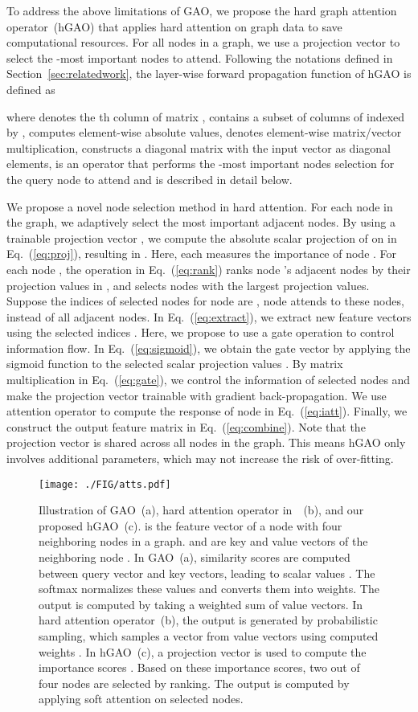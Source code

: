 \documentclass[sigconf]{acmart}
\begin{document}
To address the above limitations of GAO, we propose the hard graph
attention operator~(hGAO) that applies hard attention on graph data
to save computational resources. For all nodes in a graph, we use a
projection vector  to select the
-most important nodes to attend. Following the notations defined
in Section~\ref{sec:relatedwork}, the layer-wise forward propagation
function of hGAO is defined as

where  denotes the th column of matrix
,  contains a
subset of columns of  indexed by
,  computes element-wise absolute
values,  denotes element-wise matrix/vector multiplication,
 constructs a diagonal matrix with the input
vector as diagonal elements,  is an
operator that performs the -most important nodes selection for
the query node  to attend and is described in detail below.

We propose a novel node selection method in hard attention. For each
node in the graph, we adaptively select the  most important
adjacent nodes. By using a trainable projection vector , we compute the absolute scalar projection of  on
 in Eq.~(\ref{eq:proj}), resulting in . Here, each  measures the
importance of node . For each node , the
 operation in Eq.~(\ref{eq:rank}) ranks
node 's adjacent nodes by their projection values in , and selects nodes with the  largest projection values.
Suppose the indices of selected nodes for node  are
, node  attends to
these  nodes, instead of all adjacent nodes. In
Eq.~(\ref{eq:extract}), we extract new feature vectors
 using the
selected indices . Here, we propose to use a
gate operation to control information flow. In
Eq.~(\ref{eq:sigmoid}), we obtain the gate vector
 by applying the sigmoid function to the
selected scalar projection values . By matrix multiplication  in Eq.~(\ref{eq:gate}),
we control the information of selected nodes and make the projection
vector  trainable with gradient back-propagation. We
use attention operator to compute the response of node  in
Eq.~(\ref{eq:iatt}). Finally, we construct the output feature matrix
 in Eq.~(\ref{eq:combine}). Note that the projection
vector  is shared across all nodes in the graph. This
means hGAO only involves  additional parameters, which may not
increase the risk of over-fitting.

\begin{figure*}[t] \texttt{[image: ./FIG/atts.pdf]}
\caption{Illustration of GAO~(a), hard attention operator
in~\cite{xu2015show}~(b), and our proposed hGAO~(c). 
is the feature vector of a node with four neighboring nodes in a
graph.  and  are key and value
vectors of the neighboring node . In GAO~(a), similarity scores
are computed between query vector and key vectors, leading to scalar
values . The softmax normalizes these values and converts them
into weights. The output is computed by taking a weighted sum of
value vectors. In hard attention operator~(b), the output is
generated by probabilistic sampling, which samples a vector from
value vectors using computed weights . In hGAO~(c), a projection
vector  is used to compute the importance scores
. Based on these importance scores, two out of four nodes are
selected by ranking. The output is computed by applying soft
attention on selected nodes.} \label{fig:atts}
\end{figure*}
\end{document}
